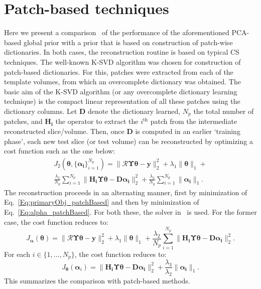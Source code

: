 \documentclass{article}
\begin{document}
\section{\textbf{Patch-based techniques}}
\label{sec:patch_based}
Here we present a comparison~\cite{my_dicta_paper} of the performance of the aforementioned PCA-based global prior with a prior that is based on construction of patch-wise dictionaries. In both cases, the reconstruction routine is based on typical CS techniques. The well-known K-SVD algorithm \cite{Aharon2006} was chosen for construction of patch-based dictionaries. For this, patches were extracted from each of the template volumes, from which an overcomplete dictionary was obtained. The basic aim of the K-SVD algorithm (or any overcomplete dictionary learning technique) is the compact linear representation of all these patches using the dictionary columns. Let $\boldsymbol{D}$ denote the dictionary learned, $N_p$ the total number of patches, and $\boldsymbol{H_i}$ the operator to extract the $i^{\textrm{th}}$ patch from the intermediate reconstructed slice/volume. Then, once $\boldsymbol{D}$ is computed in an earlier `training phase', each new test slice (or test volume) can be reconstructed by optimizing a cost function such as the one below:
\begin{multline}
J_2(\boldsymbol{\theta},\{\boldsymbol{\alpha_i}\}_{i=1}^{N_p}) = \lVert\boldsymbol{\mathcal{R}\Upsilon\theta}- \boldsymbol{y}\rVert_2^2  + \lambda_1\lVert\boldsymbol{\theta}\rVert_1 + \\ \frac{\lambda_2}{N_p}\sum_{i=1}^{N_p}\lVert \boldsymbol{H_i\Upsilon \theta}-\boldsymbol{D \alpha_i}\rVert_2^2 +\frac{\lambda_3}{ N_p}\sum_{i=1}^{N_p}\lVert\boldsymbol{\alpha_i}\rVert_1.
\label{Eq:main_patchBased}
\end{multline}
The reconstruction proceeds in an alternating manner, first by minimization of Eq.~\ref{Eq:primaryObj_patchBased} and then by minimization of Eq.~\ref{Eq:alpha_patchBased}. For both these, the solver in~\cite{l1ls} is used. For the former case, the cost function reduces to:
\begin{equation}
J_{\boldsymbol{\alpha}}(\boldsymbol{\theta}) = \lVert \boldsymbol{\mathcal{R} \Upsilon \theta}- \boldsymbol{y}\rVert_2^2  + \lambda_1\lVert\boldsymbol{\theta}\rVert_1 + \frac{\lambda_2}{N_p}\sum_{i=1}^{N_p}\rVert \boldsymbol{H_i \Upsilon \theta}-\boldsymbol{D \alpha_i}\rVert_2^2.
\label{Eq:primaryObj_patchBased}
\end{equation}
For each $i \in \{1,...,N_p\}$, the cost function reduces to:
\begin{equation}
J_{\boldsymbol{\theta}}(\boldsymbol{\alpha}_i) =  \lVert \boldsymbol{H_i \Upsilon \theta}-\boldsymbol{D\alpha_i}\rVert_2^2  + \frac{\lambda_3}{\lambda_2}\lVert\boldsymbol{\alpha_i}\rVert_1.
\label{Eq:alpha_patchBased}
\end{equation}
This summarizes the comparison with patch-based methods.
\newpage

\end{document}
